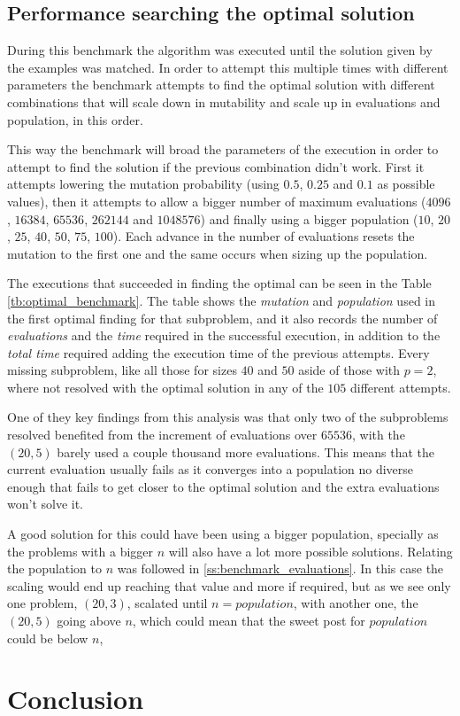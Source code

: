 \documentclass[onecolumn]{IEEEtran}
\begin{document}
\subsection{Performance searching the optimal solution\label{ss:benchmark_optimal}}

During this benchmark the algorithm was executed until the solution given by the examples
was matched. In order to attempt this multiple times with different parameters the benchmark attempts
to find the optimal solution with different combinations that will scale down in mutability and scale up
in evaluations and population, in this order.

This way the benchmark will broad the parameters of the execution in order to attempt to find the solution
if the previous combination didn't work. First it attempts lowering the mutation probability (using $0.5$,
$0.25$ and $0.1$ as possible values), then it attempts to allow a bigger number of maximum evaluations
($4096$, $16384$, $65536$, $262144$ and $1048576$) and finally using a bigger population ($10$, $20$, $25$,
$40$, $50$, $75$, $100$). Each advance in the number of evaluations resets the mutation to the first one
and the same occurs when sizing up the population.

The executions that succeeded in finding the optimal can be seen in the Table \ref{tb:optimal_benchmark}.
The table shows the \emph{mutation} and \emph{population} used in the first optimal finding for that subproblem,
and it also records the number of \emph{evaluations} and the \emph{time} required in the successful 
execution, in addition to the \emph{total time} required adding the execution time of the previous attempts.
Every missing subproblem, like all those for sizes $40$ and $50$ aside of those with $p=2$, where not
resolved with the optimal solution in any of the $105$ different attempts.



One of they key findings from this analysis was that only two of the subproblems resolved benefited from
the increment of evaluations over $65536$, with the $(20,5)$ barely used a couple thousand more evaluations.
This means that the current evaluation usually fails as it converges into a population no diverse enough
that fails to get closer to the optimal solution and the extra evaluations won't solve it.

A good solution for this could have been using a bigger population, specially as the problems with a
bigger $n$ will also have a lot more possible solutions. Relating the population to $n$ was followed in
\ref{ss:benchmark_evaluations}.
In this case the scaling would end up reaching that value and more if required, but as we see only one
problem, $(20,3)$, scalated until $n=population$, with another one, the $(20,5)$ going above $n$, which
could mean that the sweet post for $population$ could be below $n$,

\section{Conclusion}




\end{document}
